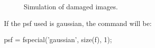 \begin{figure}[htbp]
 \centering
 \hspace{1cm}
 
 \hspace{1cm}
 
 \caption{Simulation of damaged images.\label{fig:deblurring:matlab:noisy}}
 
\end{figure}

If the psf used is gaussian, the command will be:
\begin{matlab}
psf = fspecial('gaussian', size(f), 1);
\end{matlab}


